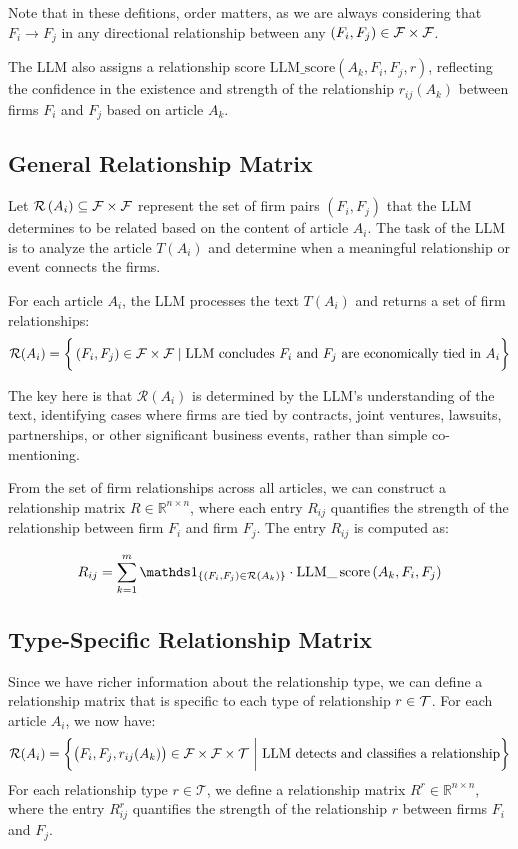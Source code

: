 Note that in these defitions, order matters, as we are always considering that $F_i \to F_j$ in any directional relationship between any $(F_i, F_j)\in\mathcal{F}\times\mathcal{F}$. 

The LLM also assigns a relationship score $ \text{LLM\_score}(A_k, F_i, F_j, r) $, reflecting the confidence in the existence and strength of the relationship $ r_{ij}(A_k) $ between firms $ F_i $ and $ F_j $ based on article $ A_k $.

\subsection{General Relationship Matrix}

Let $\mathcal{R}\left(A_i\right) \subseteq \mathcal{F} \times \mathcal{F}$ represent the set of firm pairs $\left(F_i, F_j\right)$ that the LLM determines to be related based on the content of article $A_i$. The task of the LLM is to analyze the article $T\left(A_i\right)$ and determine when a meaningful relationship or event connects the firms.

For each article $A_i$, the LLM processes the text $T\left(A_i\right)$ and returns a set of firm relationships: 
$$
\mathcal{R}(A_i)
=
\bigg{\{} 
\left(F_i, F_j\right) \in \mathcal{F} \times \mathcal{F}
\mid 
\text{LLM concludes $F_i$ and $F_j$ are economically tied in $A_i$}
 \bigg{\}}
$$

The key here is that $\mathcal{R}\left(A_i\right)$ is determined by the LLM's understanding of the text, identifying cases where firms are tied by contracts, joint ventures, lawsuits, partnerships, or other significant business events, rather than simple co-mentioning.

From the set of firm relationships across all articles, we can construct a relationship matrix $R \in \mathbb{R}^{n \times n}$, where each entry $R_{i j}$ quantifies the strength of the relationship between firm $F_i$ and firm $F_j$. The entry $R_{i j}$ is computed as:

$$
R_{i j}
=
\sum_{k=1}^m \I{(F_i, F_j) \in \mathcal{R}(A_k) }
\cdot 
\mathrm{LLM} \_\operatorname{score}\left(A_k, F_i, F_j\right)
$$


\subsection{Type-Specific Relationship Matrix}
Since we have richer information about the relationship type, we can define a relationship matrix that is specific to each type of relationship $r\in\mathcal{T}$. 
For each article $A_i$, we now have: 
$$
\mathcal{R}(A_i)
=
\bigg{\{} 
\big{(} F_i, F_j, r_{ij}(A_k) \big{)} \in \mathcal{F} \times \mathcal{F} \times \mathcal{T}
~\bigg{|}~
\text{LLM detects and classifies a relationship}
 \bigg{\}}
$$
For each relationship type $ r \in \mathcal{T} $, we define a relationship matrix $ R^r \in \mathbb{R}^{n \times n} $, where the entry $ R^r_{ij} $ quantifies the strength of the relationship $ r $ between firms $ F_i $ and $ F_j $.

